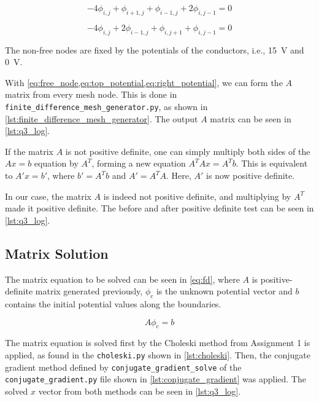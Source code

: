 \documentclass[a4paper,titlepage]{article}
\begin{document}
	\begin{equation} \label{eq:top_potential}
		-4\phi_{i, j} + \phi_{i + 1, j}  + \phi_{i - 1, j}  + 2\phi_{i, j - 1} = 0
	\end{equation}
	
	\begin{equation} \label{eq:right_potential}
		-4\phi_{i, j} + 2\phi_{i - 1, j} + \phi_{i, j + 1}  + \phi_{i, j - 1} = 0
	\end{equation}
	
	The non-free nodes are fixed by the potentials of the conductors, i.e., \SI{15}{\volt} and \SI{0}{\volt}.
	
	With \cref{eq:free_node,eq:top_potential,eq:right_potential}, we can form the $A$ matrix from every mesh node. This is done in \texttt{finite_difference_mesh_generator.py}, as shown in \cref{lst:finite_difference_mesh_generator}. The output $A$ matrix can be seen in \cref{lst:q3_log}.
	
	If the matrix $A$ is not positive definite, one can simply multiply both sides of the $Ax = b$ equation by $A^T$, forming a new equation $A^TAx = A^Tb$. This is equivalent to $A'x = b'$, where $b' = A^Tb$ and $A' = A^TA$. Here, $A'$ is now positive definite.

	In our case, the matrix $A$ is indeed not positive definite, and multiplying by $A^T$ made it positive definite. The before and after positive definite test can be seen in \cref{lst:q3_log}.
	
	\subsection{Matrix Solution}
	
	The matrix equation to be solved can be seen in \cref{eq:fd}, where $A$ is positive-definite matrix generated previously, $\phi_c$ is the unknown potential vector and $b$ contains the initial potential values along the boundaries.
	
	\begin{equation} \label{eq:fd}
		A\phi_c = b
	\end{equation}
	
	The matrix equation is solved first by the Choleski method from Assignment 1 is applied, as found in the \texttt{choleski.py} shown in \cref{lst:choleski}. Then, the conjugate gradient method defined by \texttt{conjugate_gradient_solve} of the \texttt{conjugate_gradient.py} file shown in \cref{lst:conjugate_gradient} was applied. The solved $x$ vector from both methods can be seen in \cref{lst:q3_log}.
	
\end{document}

